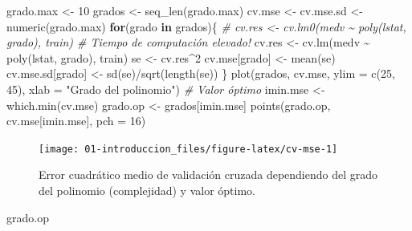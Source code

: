 \documentclass[
  spanish,
]{book}
\newenvironment{Shaded}{\begin{snugshade}}{\end{snugshade}}
\newcommand{\AttributeTok}[1]{\textcolor[rgb]{0.77,0.63,0.00}{#1}}
\newcommand{\CommentTok}[1]{\textcolor[rgb]{0.56,0.35,0.01}{\textit{#1}}}
\newcommand{\ControlFlowTok}[1]{\textcolor[rgb]{0.13,0.29,0.53}{\textbf{#1}}}
\newcommand{\DecValTok}[1]{\textcolor[rgb]{0.00,0.00,0.81}{#1}}
\newcommand{\FunctionTok}[1]{\textcolor[rgb]{0.00,0.00,0.00}{#1}}
\newcommand{\NormalTok}[1]{#1}
\newcommand{\OtherTok}[1]{\textcolor[rgb]{0.56,0.35,0.01}{#1}}
\newcommand{\SpecialCharTok}[1]{\textcolor[rgb]{0.00,0.00,0.00}{#1}}
\newcommand{\StringTok}[1]{\textcolor[rgb]{0.31,0.60,0.02}{#1}}
\theoremstyle{break}
\theoremstyle{definition}
\theoremstyle{definition}
\theoremstyle{definition}
\theoremstyle{definition}
\theoremstyle{remark}
\begin{document}
\begin{Shaded}
\begin{Highlighting}[]
\NormalTok{grado.max }\OtherTok{\textless{}{-}} \DecValTok{10}
\NormalTok{grados }\OtherTok{\textless{}{-}} \FunctionTok{seq\_len}\NormalTok{(grado.max) }
\NormalTok{cv.mse }\OtherTok{\textless{}{-}}\NormalTok{ cv.mse.sd }\OtherTok{\textless{}{-}} \FunctionTok{numeric}\NormalTok{(grado.max)}
\ControlFlowTok{for}\NormalTok{(grado }\ControlFlowTok{in}\NormalTok{ grados)\{}
  \CommentTok{\# cv.res \textless{}{-} cv.lm0(medv \textasciitilde{} poly(lstat, grado), train) \# Tiempo de computación elevado!}
\NormalTok{  cv.res }\OtherTok{\textless{}{-}} \FunctionTok{cv.lm}\NormalTok{(medv }\SpecialCharTok{\textasciitilde{}} \FunctionTok{poly}\NormalTok{(lstat, grado), train)}
\NormalTok{  se }\OtherTok{\textless{}{-}}\NormalTok{ cv.res}\SpecialCharTok{\^{}}\DecValTok{2}
\NormalTok{  cv.mse[grado] }\OtherTok{\textless{}{-}} \FunctionTok{mean}\NormalTok{(se)}
\NormalTok{  cv.mse.sd[grado] }\OtherTok{\textless{}{-}} \FunctionTok{sd}\NormalTok{(se)}\SpecialCharTok{/}\FunctionTok{sqrt}\NormalTok{(}\FunctionTok{length}\NormalTok{(se))}
\NormalTok{\}}
\FunctionTok{plot}\NormalTok{(grados, cv.mse, }\AttributeTok{ylim =} \FunctionTok{c}\NormalTok{(}\DecValTok{25}\NormalTok{, }\DecValTok{45}\NormalTok{),}
  \AttributeTok{xlab =} \StringTok{"Grado del polinomio"}\NormalTok{)}
\CommentTok{\# Valor óptimo}
\NormalTok{imin.mse }\OtherTok{\textless{}{-}} \FunctionTok{which.min}\NormalTok{(cv.mse)}
\NormalTok{grado.op }\OtherTok{\textless{}{-}}\NormalTok{ grados[imin.mse]}
\FunctionTok{points}\NormalTok{(grado.op, cv.mse[imin.mse], }\AttributeTok{pch =} \DecValTok{16}\NormalTok{)}
\end{Highlighting}
\end{Shaded}

\begin{figure}[!htb]

{\centering \texttt{[image: 01-introduccion\_files/figure-latex/cv-mse-1]} 

}

\caption{Error cuadrático medio de validación cruzada dependiendo del grado del polinomio (complejidad) y valor óptimo.}\label{fig:cv-mse}
\end{figure}

\begin{Shaded}
\begin{Highlighting}[]
\NormalTok{grado.op}
\end{Highlighting}
\end{Shaded}
\end{document}
